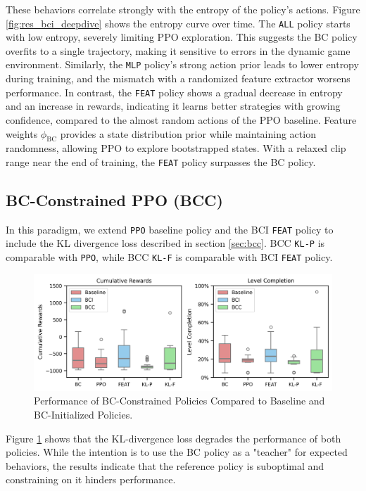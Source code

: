 \documentclass{article}
\begin{document}
These behaviors correlate strongly with the entropy of the policy's 
actions. Figure \ref{fig:res_bci_deepdive} shows the entropy curve over 
time. The \texttt{ALL} policy starts with low entropy, severely limiting 
PPO exploration. This suggests the BC policy overfits to a single 
trajectory, making it sensitive to errors in the dynamic 
game environment. Similarly, the \texttt{MLP} policy's strong action 
prior leads to lower entropy during training, and the mismatch with a 
randomized feature extractor worsens performance. In contrast, the 
\texttt{FEAT} policy shows a gradual decrease in entropy and an increase 
in rewards, indicating it learns better strategies with growing 
confidence, compared to the almost random actions of the PPO baseline.
Feature weights $\phi_{\text{BC}}$ provides a state distribution prior while 
maintaining action randomness, allowing PPO to explore bootstrapped 
states. With a relaxed clip range near the end of training, the 
\texttt{FEAT} policy surpasses the BC policy.


\subsection{BC-Constrained PPO (BCC)}
\label{sec:bcc-exp}

In this paradigm, we extend \texttt{PPO} baseline policy and the BCI \texttt{FEAT}
policy to include the KL divergence loss described in section \ref{sec:bcc}.
BCC \texttt{KL-P} is comparable with \texttt{PPO}, while BCC \texttt{KL-F} is comparable
with BCI \texttt{FEAT} policy.

\begin{figure}[htbp]
      \centering
      \includegraphics[width=\columnwidth]{figures/cum_rewards_bcc.png}
      \caption{Performance of BC-Constrained Policies Compared to Baseline 
      and BC-Initialized Policies.}
      \label{fig:res_bcc}
\end{figure}

Figure \ref{fig:res_bcc} shows that the KL-divergence loss degrades the 
performance of both policies. While the intention is to use the BC policy 
as a "teacher" for expected behaviors, the results indicate that the 
reference policy is suboptimal and constraining on it hinders performance.
\end{document}
